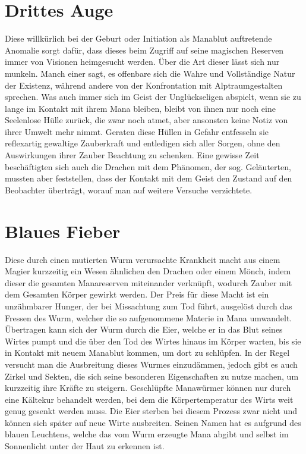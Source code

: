 \documentclass[a4paper,12pt,oneside]{book}
\begin{document}
\section{Drittes Auge}
Diese willkürlich bei der Geburt oder Initiation als Manablut auftretende Anomalie sorgt dafür, dass dieses beim Zugriff auf seine magischen Reserven immer von Visionen heimgesucht werden. Über die Art dieser lässt sich nur munkeln. Manch einer sagt, es offenbare sich die Wahre und Vollständige Natur der Existenz, während andere von der Konfrontation mit Alptraumgestalten sprechen. Was auch immer sich im Geist der Unglückseligen abspielt, wenn sie zu lange im Kontakt mit ihrem Mana bleiben, bleibt von ihnen nur noch eine Seelenlose Hülle zurück, die zwar noch atmet, aber ansonsten keine Notiz von ihrer Umwelt mehr nimmt. Geraten diese Hüllen in Gefahr entfesseln sie reflexartig gewaltige Zauberkraft und entledigen sich aller Sorgen, ohne den Auswirkungen ihrer Zauber Beachtung zu schenken. Eine gewisse Zeit beschäftigten sich auch die Drachen mit dem Phänomen, der sog. Geläuterten, mussten aber feststellen, dass der Kontakt mit dem Geist den Zustand auf den Beobachter überträgt, worauf man auf weitere Versuche verzichtete.
\section{Blaues Fieber}
Diese durch einen mutierten Wurm verursachte Krankheit macht aus einem Magier kurzzeitig ein Wesen ähnlichen den Drachen oder einem Mönch, indem dieser die gesamten Manareserven miteinander verknüpft, wodurch Zauber mit dem Gesamten Körper gewirkt werden. Der Preis für diese Macht ist ein unzähmbarer Hunger, der bei Missachtung zum Tod führt, ausgelöst durch das Fressen des Wurm, welcher die so aufgenommene Materie in Mana umwandelt. Übertragen kann sich der Wurm durch die Eier, welche er in das Blut seines Wirtes pumpt und die über den Tod des Wirtes hinaus im Körper warten, bis sie in Kontakt mit neuem Manablut kommen, um dort zu schlüpfen. In der Regel versucht man die Ausbreitung dieses Wurmes einzudämmen, jedoch gibt es auch Zirkel und Sekten, die sich seine besonderen Eigenschaften zu nutze machen, um kurzzeitig ihre Kräfte zu steigern. Geschlüpfte Manawürmer können nur durch eine Kältekur behandelt werden, bei dem die Körpertemperatur des Wirts weit genug gesenkt werden muss. Die Eier sterben bei diesem Prozess zwar nicht und können sich später auf neue Wirte ausbreiten. Seinen Namen hat es aufgrund des blauen Leuchtens, welche das vom Wurm erzeugte Mana abgibt und selbst im Sonnenlicht unter der Haut zu erkennen ist.
\end{document}
